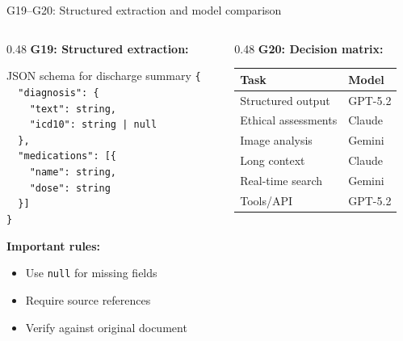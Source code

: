 \documentclass[aspectratio=169, 10pt]{beamer}
\begin{document}
\begin{frame}{G19--G20: Structured extraction and model comparison}
    \begin{columns}[T]
        \begin{column}{0.48\textwidth}
            \textbf{G19: Structured extraction:}
            \footnotesize
            \begin{block}{\scriptsize JSON schema for discharge summary}
                \scriptsize
                \texttt{\{} \\
                \texttt{~~"diagnosis": \{} \\
                \texttt{~~~~"text": string,} \\
                \texttt{~~~~"icd10": string | null} \\
                \texttt{~~\},} \\
                \texttt{~~"medications": [\{} \\
                \texttt{~~~~"name": string,} \\
                \texttt{~~~~"dose": string} \\
                \texttt{~~\}]} \\
                \texttt{\}}
            \end{block}
            
            \footnotesize
            \textbf{Important rules:}
            \begin{itemize}
                \item Use \texttt{null} for missing fields
                \item Require source references
                \item Verify against original document
            \end{itemize}
        \end{column}
        \begin{column}{0.48\textwidth}
            \textbf{G20: Decision matrix:}
            \scriptsize
            \begin{tabular}{ll}
                \toprule
                \textbf{Task} & \textbf{Model} \\
                \midrule
                Structured output & GPT-5.2 \\
                Ethical assessments & Claude \\
                Image analysis & Gemini \\
                Long context & Claude \\
                Real-time search & Gemini \\
                Tools/API & GPT-5.2 \\
                \bottomrule
            \end{tabular}
            

\end{column}
\end{columns}
\end{frame}
\end{document}
